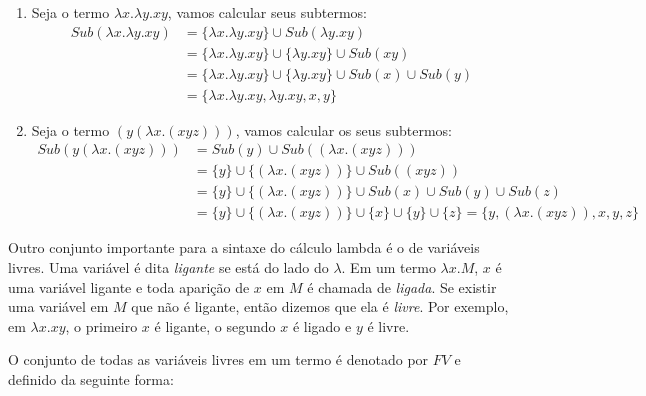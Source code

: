 \documentclass[../main.tex]{subfiles}
\begin{document}
\begin{enumerate}
    \item Seja o termo $\lambda x . \lambda y . xy$, vamos calcular seus subtermos:
    \begin{equation*}
        \begin{split}
            Sub(\lambda x . \lambda y . xy) & = \{\lambda x . \lambda y . xy\} \cup Sub(\lambda y . xy)
                                         \\ & = \{\lambda x . \lambda y . xy\} \cup \{\lambda y . xy\} \cup Sub(xy)
                                         \\ & = \{\lambda x . \lambda y . xy\} \cup \{\lambda y . xy\} \cup Sub(x) \cup Sub(y)
                                         \\ & = \{\lambda x . \lambda y . xy, \lambda y . xy, x, y\}
        \end{split}
    \end{equation*}
    \item Seja o termo $(y (\lambda x . (xyz)))$, vamos calcular os seus subtermos:
    \begin{equation*}
        \begin{split}
            Sub(y (\lambda x . (xyz))) & = Sub(y) \cup Sub((\lambda x . (xyz)))
                                    \\ & = \{y\} \cup \{(\lambda x . (xyz))\} \cup Sub((xyz))
                                    \\ & = \{y\} \cup \{(\lambda x . (xyz))\} \cup Sub(x) \cup Sub(y) \cup Sub(z)
                                    \\ & = \{y\} \cup \{(\lambda x . (xyz))\} \cup \{x\} \cup \{y\} \cup \{z\} = \{y,(\lambda x . (xyz)), x, y, z \}
        \end{split}
    \end{equation*}
\end{enumerate}

Outro conjunto importante para a sintaxe do cálculo lambda é o de variáveis livres. Uma variável é dita \emph{ligante} se está do lado do $\lambda$. Em um termo $\lambda x . M$, $x$ é uma variável ligante e toda aparição de $x$ em $M$ é chamada de \emph{ligada}. Se existir uma variável em $M$ que não é ligante, então dizemos que ela é \emph{livre}. Por exemplo, em $\lambda x . xy$, o primeiro $x$ é ligante, o segundo $x$ é ligado e $y$ é livre. 

O conjunto de todas as variáveis livres em um termo é denotado por $FV$ e definido da seguinte forma:
\end{document}
